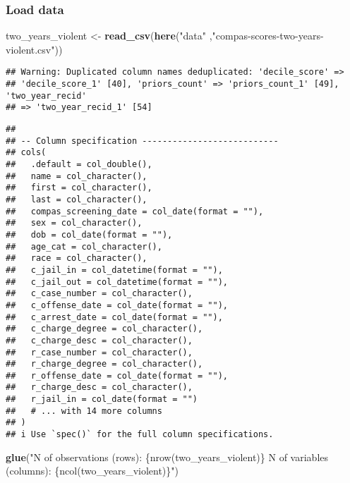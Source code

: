 \documentclass[
]{book}
\newenvironment{Shaded}{\begin{snugshade}}{\end{snugshade}}
\newcommand{\KeywordTok}[1]{\textcolor[rgb]{0.13,0.29,0.53}{\textbf{#1}}}
\newcommand{\NormalTok}[1]{#1}
\newcommand{\StringTok}[1]{\textcolor[rgb]{0.31,0.60,0.02}{#1}}
\begin{document}
\hypertarget{load-data-1}{%
\subsubsection{Load data}\label{load-data-1}}

\begin{Shaded}
\begin{Highlighting}[]
\NormalTok{two\_years\_violent \textless{}{-}}\StringTok{ }\KeywordTok{read\_csv}\NormalTok{(}\KeywordTok{here}\NormalTok{(}\StringTok{"data"}\NormalTok{ ,}\StringTok{"compas{-}scores{-}two{-}years{-}violent.csv"}\NormalTok{))}
\end{Highlighting}
\end{Shaded}

\begin{verbatim}
## Warning: Duplicated column names deduplicated: 'decile_score' =>
## 'decile_score_1' [40], 'priors_count' => 'priors_count_1' [49], 'two_year_recid'
## => 'two_year_recid_1' [54]
\end{verbatim}

\begin{verbatim}
## 
## -- Column specification ---------------------------
## cols(
##   .default = col_double(),
##   name = col_character(),
##   first = col_character(),
##   last = col_character(),
##   compas_screening_date = col_date(format = ""),
##   sex = col_character(),
##   dob = col_date(format = ""),
##   age_cat = col_character(),
##   race = col_character(),
##   c_jail_in = col_datetime(format = ""),
##   c_jail_out = col_datetime(format = ""),
##   c_case_number = col_character(),
##   c_offense_date = col_date(format = ""),
##   c_arrest_date = col_date(format = ""),
##   c_charge_degree = col_character(),
##   c_charge_desc = col_character(),
##   r_case_number = col_character(),
##   r_charge_degree = col_character(),
##   r_offense_date = col_date(format = ""),
##   r_charge_desc = col_character(),
##   r_jail_in = col_date(format = "")
##   # ... with 14 more columns
## )
## i Use `spec()` for the full column specifications.
\end{verbatim}

\begin{Shaded}
\begin{Highlighting}[]
\KeywordTok{glue}\NormalTok{(}\StringTok{"N of observations (rows): \{nrow(two\_years\_violent)\}}
\StringTok{      N of variables (columns): \{ncol(two\_years\_violent)\}"}\NormalTok{)}
\end{Highlighting}
\end{Shaded}
\end{document}
